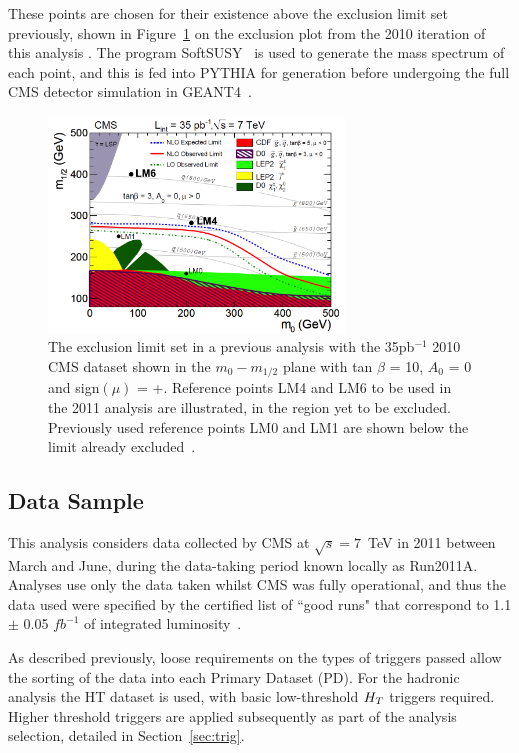 These points are chosen for their existence above the exclusion limit set previously, shown in Figure~\ref{fig:lm35limit} on the exclusion plot from the 2010 iteration of this analysis \cite{35paper}. The program SoftSUSY~\cite{softsusy} is used to generate the mass spectrum of each point, and this is fed into \textsc{PYTHIA} for generation before undergoing the full CMS detector simulation in GEANT4~\cite{GEANT4}.

\begin{figure}[htbp]
\centering
\includegraphics[width=0.70\textwidth]{Figures/Analysis/LM46on35limit}
\caption[The exclusion limit set in a previous analysis with the 35pb$^{-1}$ 2010 CMS dataset shown in the $m_{0}-m_{1/2}$ plane with tan $\beta$ = 10, $A_{0}$ = 0 and sign$(\mu)$ = +.]{\label{fig:lm35limit}The exclusion limit set in a previous analysis with the 35pb$^{-1}$ 2010 CMS dataset shown in the $m_{0}-m_{1/2}$ plane with tan $\beta$ = 10, $A_{0}$ = 0 and sign$(\mu)$ = +. Reference points LM4 and LM6 to be used in the 2011 analysis are illustrated, in the region yet to be excluded. Previously used reference points LM0 and LM1 are shown below the limit already excluded~\cite{35paper}.}
\end{figure}

\subsection{Data Sample}
\label{sec:datasam}
This analysis considers data collected by CMS at $\sqrt{s} = 7$~TeV in 2011 between March and June, during the data-taking period known locally as Run2011A. Analyses use only the data taken whilst CMS was fully operational, and thus the data used were specified by the certified list of ``good runs" that correspond to 1.1 $\pm$ 0.05 $fb^{-1}$ of integrated luminosity~\cite{EWK-11-001}.

As described previously, loose requirements on the types of triggers passed allow the sorting of the data into each Primary Dataset (PD). For the hadronic analysis the HT dataset is used, with basic low-threshold $H_{T}$ triggers required. Higher threshold triggers are applied subsequently as part of the analysis selection, detailed in Section~\ref{sec:trig}.

